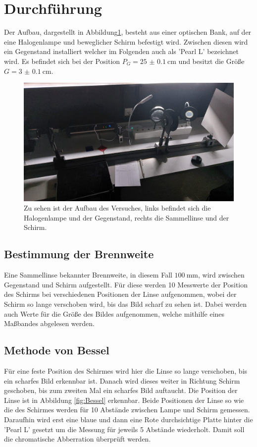 \section{Durchführung}
\label{sec:Durchführung}
Der Aufbau, dargestellt in Abbildung\ref{fig:Aufbau}, besteht aus einer optischen Bank, auf der eine Halogenlampe und beweglicher Schirm befestigt wird. 
Zwischen diesen wird ein Gegenstand installiert welcher im Folgenden auch als 'Pearl L' bezeichnet wird.
Es befindet sich bei der Position $P_G=\qty{25(0.1)}{\centi\meter}$ und besitzt die Größe $G=\qty{3(0.1)}{\centi\meter}$.


\begin{figure}[H]
    \includegraphics[width=\textwidth]{Bilder/Aufbau.jpg}
    \centering
    \caption{Zu sehen ist der Aufbau des Versuches, links befindet sich die Halogenlampe und der Gegenstand, rechts die Sammellinse und der Schirm.}
    \label{fig:Aufbau}
\end{figure}

\subsection{Bestimmung der Brennweite}
Eine Sammellinse bekannter Brennweite, in diesem Fall $\qty{100}{\milli\meter}$, wird zwischen Gegenstand und Schirm aufgestellt.
Für diese werden 10 Messwerte der Position des Schirms bei verschiedenen Positionen der Linse aufgenommen, wobei der Schirm so lange verschoben wird, bis das Bild scharf zu sehen ist.
Dabei werden auch Werte für die Größe des Bildes aufgenommen, welche mithilfe eines Maßbandes abgelesen werden.

\subsection{Methode von Bessel}
Für eine feste Position des Schirmes wird hier die Linse so lange verschoben, bis ein scharfes Bild erkennbar ist. 
Danach wird dieses weiter in Richtung Schirm geschoben, bis zum zweiten Mal ein scharfes Bild auftaucht.
Die Position der Linse ist in Abbildung \ref{fig:Bessel} erkennbar.
Beide Positionen der Linse so wie die des Schirmes werden für 10 Abstände zwischen Lampe und Schirm gemessen.
Daraufhin wird erst eine blaue und dann eine Rote durchsichtige Platte hinter die 'Pearl L' gesetzt um die Messung für jeweils 5 Abstände wiederholt.
Damit soll die chromatische Abberration überprüft werden.

